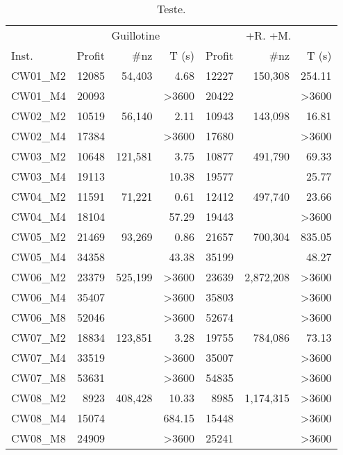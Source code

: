\documentclass[ppgc,tese,english,formais,babel]{iiufrgs}
\newcommand{\ditto}{\textquotedbl}
\begin{document}
\begin{table}
\centering
\caption{Teste.}
\label{tab:G2MKP_CW_joined}
\begin{tabular}{lrrrrrr}
\hline\hline
& \multicolumn{3}{c}{Guillotine} & \multicolumn{3}{c}{+R. +M.} \\\cmidrule(lr){2-4}\cmidrule(lr){5-7}
Inst. & Profit & \#nz & T (s) & Profit & \#nz & T (s) \\\hline
CW01\_M2 & 12085 & 54,403 & 4.68 & 12227 & 150,308 & 254.11 \\
\rowcolor{gray-inner-row} CW01\_M4 & 20093 & \ditto & >3600 & 20422 & \ditto & >3600 \\
CW02\_M2 & 10519 & 56,140 & 2.11 & 10943 & 143,098 & 16.81 \\
\rowcolor{gray-inner-row} CW02\_M4 & 17384 & \ditto & >3600 & 17680 & \ditto & >3600 \\
CW03\_M2 & 10648 & 121,581 & 3.75 & 10877 & 491,790 & 69.33 \\
\rowcolor{gray-inner-row} CW03\_M4 & 19113 & \ditto & 10.38 & 19577 & \ditto & 25.77 \\
CW04\_M2 & 11591 & 71,221 & 0.61 & 12412 & 497,740 & 23.66 \\
\rowcolor{gray-inner-row} CW04\_M4 & 18104 & \ditto & 57.29 & 19443 & \ditto & >3600 \\
CW05\_M2 & 21469 & 93,269 & 0.86 & 21657 & 700,304 & 835.05 \\
\rowcolor{gray-inner-row} CW05\_M4 & 34358 & \ditto & 43.38 & 35199 & \ditto & 48.27 \\
CW06\_M2 & 23379 & 525,199 & >3600 & 23639 & 2,872,208 & >3600 \\
\rowcolor{gray-inner-row} CW06\_M4 & 35407 & \ditto & >3600 & 35803 & \ditto & >3600 \\
\rowcolor{gray-table-row} CW06\_M8 & 52046 & \ditto & >3600 & 52674 & \ditto & >3600 \\
CW07\_M2 & 18834 & 123,851 & 3.28 & 19755 & 784,086 & 73.13 \\
\rowcolor{gray-inner-row} CW07\_M4 & 33519 & \ditto & >3600 & 35007 & \ditto & >3600 \\
\rowcolor{gray-table-row} CW07\_M8 & 53631 & \ditto & >3600 & 54835 & \ditto & >3600 \\
CW08\_M2 & 8923 & 408,428 & 10.33 & 8985 & 1,174,315 & >3600 \\
\rowcolor{gray-inner-row} CW08\_M4 & 15074 & \ditto & 684.15 & 15448 & \ditto & >3600 \\
\rowcolor{gray-table-row} CW08\_M8 & 24909 & \ditto & >3600 & 25241 & \ditto & >3600 \\

\end{tabular}
\end{table}
\end{document}
